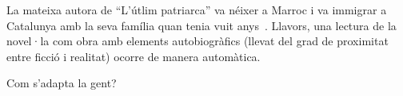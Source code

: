La mateixa autora de ``L'útlim patriarca'' va néixer a Marroc i va immigrar a Catalunya amb la seva família quan tenia vuit anys~\autocite{Vidal2012}.
Llavors, una lectura de la novel·la com obra amb elements autobiogràfics (llevat del grad de proximitat entre ficció i realitat) ocorre de manera automàtica.

Com s'adapta la gent?


\begin{comment}

La població estrangera a Catalunya (APUNTS de prospectiva territorial, numero 2)

--> discuteix la població estrangera i el seu desenvolupament en el periode de 2000-2013
analitza la distribució territorial

"a partir de la dècada de 1980 es produexien diverses onades migratòries del nord d'Àfrica"
--> ich glaube, mein Roman faellt hier rein; nach meinen Berechnungen sind sie Anfang der 90ern nach Catalunya gekommen

"A Catalunya [...] El primer contigent són els africans (27.5\%), la gran majoria marroquins (20.4\% del total d'immigrants a Catalunya)."

"El col·lectiu procedent del Marroc ha estat el més important des dels inicis de la immigració estrangera recent a Catalunya, tant pel nombre com per la seva distribució en el territori."

"El marroquins, segon grup de la província, presenta una migració més masculina en els grups de més edat (majors de 35 anys), però equilibrada en les edat inferiors. Destaca especialment l'important volum de població infantil: el 14,6\% dels marroquins tenen menys de 5 anys."

relevància per a mi:
trets/dades històrics serveixen com a base per la història

------------------------

[Candel1965]

Els altres catalans

"On hi ha feina, hi són ells" (p.17)
"A la terra dels seus pares no hi ha feina" (p.17)
"Se senten conquistats per Catalunya; no del tot, és clar [...] si els diuen murcians o gallecs s'enfaden; si els diuen catalans, no" (p.17)
"Davant la persistent i discutida qüestió: "...heu vingut a menjar-vos el pa dels catalans..." es posen furiosos, naturalmen! i aleshores, només aleshores, malparlen de Catalunya. A ells no els el regala ningú, el pa; ells se'l suen;" (p.17)

"I de vegades ells mateixos, amb la mateixa espasa flamígera esmentada de "heu vingut a menjar-vos el pa.." etcètera, ataquen els darrers immigrants que denigren Catalunya. Punt." (p.17)


\end{comment}
